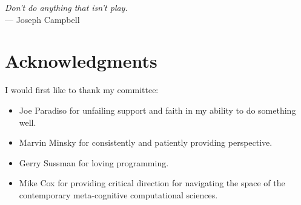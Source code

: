 



\begin{flushright}{\slshape    
Don't do anything that isn't play.} \\ \medskip
    --- Joseph Campbell
\end{flushright}



\bigskip

\begingroup
\let\clearpage\relax
\let\cleardoublepage\relax
\let\cleardoublepage\relax
\chapter*{Acknowledgments}

I would first like to thank my committee:

\begin{itemize}
\item{Joe Paradiso for unfailing support and faith in my ability to do
  something well.}
\item{Marvin Minsky for consistently and patiently providing
  perspective.}
\item{Gerry Sussman for loving programming.}
\item{Mike Cox for providing critical direction for navigating the
  space of the contemporary meta-cognitive computational sciences.}
\end{itemize}


\endgroup



